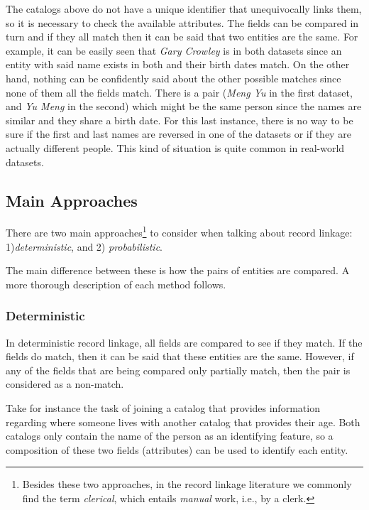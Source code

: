 \documentclass[epsfig,a4paper,11pt,titlepage,twoside,openany]{book}
\begin{document}
The catalogs above do not have a unique identifier that unequivocally links them, so it is necessary to check the available attributes. The fields can be compared in turn and if they all match then it can be said that two entities are the same. For example, it can be easily seen that \textit{Gary Crowley} is in both datasets since an entity with said name exists in both and their birth dates match. On the other hand, nothing can be confidently said about the other possible matches since none of them all the fields match. There is a pair (\textit{Meng Yu} in the first dataset, and \textit{Yu Meng} in the second) which might be the same person since the names are similar and they share a birth date. For this last instance, there is no way to be sure if the first and last names are reversed in one of the datasets or if they are actually different people. This kind of situation is quite common in real-world datasets.





\subsection{Main Approaches}
\label{sec:rl-main-approaches}

There are two main approaches\footnote{Besides these two approaches, in the record linkage literature we commonly find the term \textit{clerical}, which entails \textit{manual} work, i.e., by a clerk.} to consider when talking about record linkage: 1)\textit{deterministic}, and 2) \textit{probabilistic}. 

The main difference between these is how the pairs of entities are compared. A more thorough description of each method follows.


\subsubsection{Deterministic}
\label{sec:rl-approach-deterministic}

In deterministic record linkage, all fields are compared to see if they match. If the fields do match, then it can be said that these entities are the same. However, if any of the fields that are being compared only partially match, then the pair is considered as a non-match. 

Take for instance the task of joining a catalog that provides information regarding where someone
lives with another catalog that provides their age. Both catalogs only contain the
name of the person as an identifying feature, so a composition of
these two fields (attributes) can be used to identify each entity.
\end{document}
